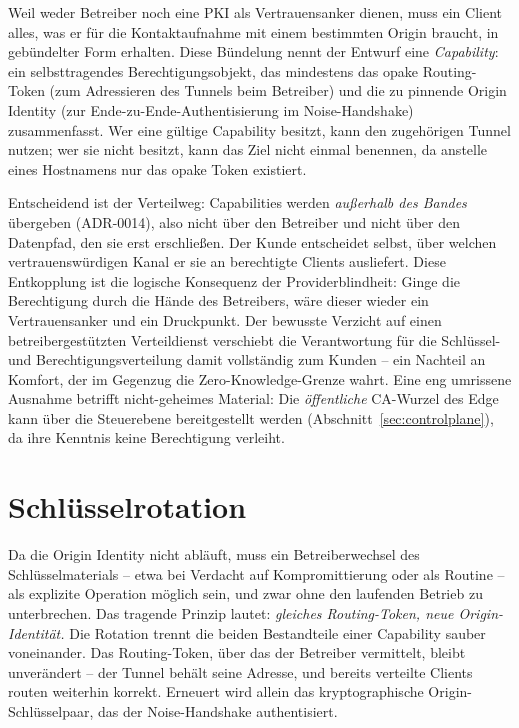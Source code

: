 Weil weder Betreiber noch eine PKI als Vertrauensanker dienen, muss ein Client
alles, was er für die Kontaktaufnahme mit einem bestimmten Origin braucht, in
gebündelter Form erhalten. Diese Bündelung nennt der Entwurf eine
\emph{Capability}: ein selbsttragendes Berechtigungsobjekt, das mindestens das
opake Routing-Token (zum Adressieren des Tunnels beim Betreiber) und die zu
pinnende Origin Identity (zur Ende-zu-Ende-Authentisierung im Noise-Handshake)
zusammenfasst. Wer eine gültige Capability besitzt, kann den zugehörigen Tunnel
nutzen; wer sie nicht besitzt, kann das Ziel nicht einmal benennen, da anstelle
eines Hostnamens nur das opake Token existiert.

Entscheidend ist der Verteilweg: Capabilities werden \emph{außerhalb des Bandes}
übergeben (ADR-0014), also nicht über den Betreiber und nicht über den Datenpfad,
den sie erst erschließen. Der Kunde entscheidet selbst, über welchen
vertrauenswürdigen Kanal er sie an berechtigte Clients ausliefert. Diese
Entkopplung ist die logische Konsequenz der Providerblindheit: Ginge die
Berechtigung durch die Hände des Betreibers, wäre dieser wieder ein
Vertrauensanker und ein Druckpunkt. Der bewusste Verzicht auf einen
betreibergestützten Verteildienst verschiebt die Verantwortung für die
Schlüssel- und Berechtigungsverteilung damit vollständig zum Kunden -- ein
Nachteil an Komfort, der im Gegenzug die Zero-Knowledge-Grenze wahrt. Eine eng
umrissene Ausnahme betrifft nicht-geheimes Material: Die \emph{öffentliche}
CA-Wurzel des Edge kann über die Steuerebene bereitgestellt werden
(Abschnitt~\ref{sec:controlplane}), da ihre Kenntnis keine Berechtigung verleiht.

\section{Schlüsselrotation}
\label{sec:rotation}

Da die Origin Identity nicht abläuft, muss ein Betreiberwechsel des
Schlüsselmaterials -- etwa bei Verdacht auf Kompromittierung oder als Routine --
als explizite Operation möglich sein, und zwar ohne den laufenden Betrieb zu
unterbrechen. Das tragende Prinzip lautet: \emph{gleiches Routing-Token, neue
Origin-Identität.} Die Rotation trennt die beiden Bestandteile einer Capability
sauber voneinander. Das Routing-Token, über das der Betreiber vermittelt, bleibt
unverändert -- der Tunnel behält seine Adresse, und bereits verteilte Clients
routen weiterhin korrekt. Erneuert wird allein das kryptographische
Origin-Schlüsselpaar, das der Noise-Handshake authentisiert.


